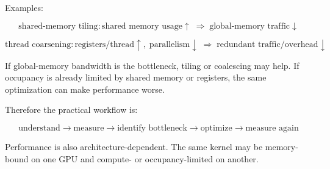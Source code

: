 \documentclass[11pt]{article}
\begin{document}
Examples:

\[
\boxed{
\text{shared-memory tiling}
:
\text{shared memory usage}\uparrow
\;\Rightarrow\;
\text{global-memory traffic}\downarrow
}
\]

\[
\boxed{
\text{thread coarsening}
:
\text{registers/thread}\uparrow,\;
\text{parallelism}\downarrow
\;\Rightarrow\;
\text{redundant traffic/overhead}\downarrow
}
\]

If global-memory bandwidth is the bottleneck, tiling or coalescing may help. If occupancy is already limited by shared memory or registers, the same optimization can make performance worse.

Therefore the practical workflow is:

\[
\boxed{
\text{understand}
\rightarrow
\text{measure}
\rightarrow
\text{identify bottleneck}
\rightarrow
\text{optimize}
\rightarrow
\text{measure again}
}
\]

Performance is also architecture-dependent. The same kernel may be memory-bound on one GPU and compute- or occupancy-limited on another.
\end{document}
